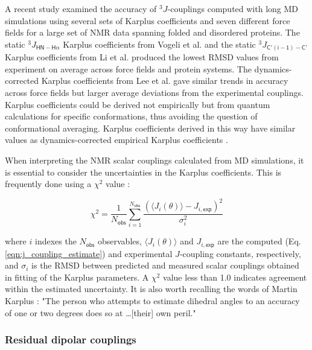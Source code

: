 \documentclass[9pt,review,pubversion]{livecoms}
\begin{document}
A recent study \cite{robustelli_developing_2018} examined the accuracy of $^3J$-couplings computed with long MD simulations using several sets of Karplus coefficients and seven different force fields for a large set of NMR data spanning folded and disordered proteins. The static $^3J_{\mathsf{HN-H\alpha}}$ Karplus coefficients from Vogeli et al. \cite{vogeli_limits_2007} and the static $^3J_{\mathsf{C'(i-1)-C'}}$ Karplus coefficients from Li et al. \cite{li_high_2015} produced the lowest RMSD values from experiment on average across force fields and protein systems.
The dynamics-corrected Karplus coefficients from Lee et al. \cite{lee_quantitative_2015} gave similar trends in accuracy across force fields but larger average deviations from the experimental couplings.
Karplus coefficients could be derived not empirically but from quantum calculations for specific conformations, thus avoiding the question of conformational averaging.
Karplus coefficients derived in this way have similar values as dynamics-corrected empirical Karplus coefficients \cite{brueschweiler_adding_1994,case_static_2000,chou_insights_2003,lindorff-larsen_interpreting_2005,vogeli_limits_2007,lee_quantitative_2015}.

When interpreting the NMR scalar couplings calculated from MD simulations, it is essential to consider the uncertainties in the Karplus coefficients.
This is frequently done using a $\chi^2$ value \cite{best_balanced_2014,robustelli_developing_2018}:

\begin{equation}
\label{eqn:chi_sq}
\chi^2 = \frac {1} {N_{\mathsf{obs}}} \sum_{i=1}^{N_{\mathsf{obs}}} \frac {\left( \langle J_i(\theta) \rangle - J_{i,\mathsf{exp}} \right)^2} {\sigma_i^2}
\end{equation}

\noindent where $i$ indexes the $N_{\mathsf{obs}}$ observables, $\langle J_i(\theta) \rangle$ and $J_{i,\mathsf{exp}}$ are the computed (Eq. \ref{eqn:j_coupling_estimate}) and experimental $J$-coupling constants, respectively, and $\sigma_i$ is the RMSD between predicted and measured scalar couplings obtained in fitting of the Karplus parameters. A $\chi^2$ value less than 1.0 indicates agreement within the estimated uncertainty. It is also worth recalling the words of Martin Karplus \cite{karplus_vicinal_1963}: "The person who attempts to estimate dihedral angles to an accuracy of one or two degrees does so at \ldots [their] own peril."

\subsubsection{Residual dipolar couplings}
\label{sub2:rdc}
\end{document}
